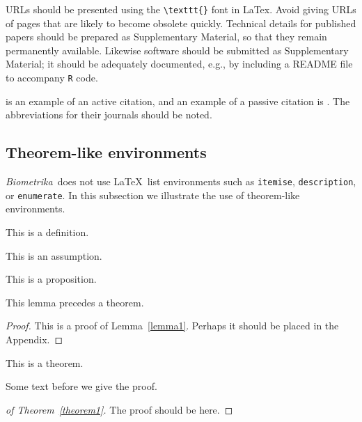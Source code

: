 \documentclass[lineno]{biometrika}
\def\Bka{{\it Biometrika}}
\begin{document}
 URLs should be presented using the \verb;\texttt{}; font in LaTex. Avoid giving URLs of pages that are likely
to become obsolete quickly.  Technical details for published papers should be prepared as Supplementary Material, so that they remain permanently available. Likewise software should be submitted as Supplementary Material; it should be adequately documented, e.g., by including a README file to accompany \texttt{R} code.

\citet{Cox:1972} is an example of an active citation, and an example of a passive citation is  \citep{Hear:Holm:Step:quan:2006}.  The abbreviations for their journals should be noted.

\subsection{Theorem-like environments}

\Bka\ does not use \LaTeX\ list environments such as \texttt{itemise}, \texttt{description}, or \texttt{enumerate}.
In this subsection we illustrate the use of theorem-like environments.

\begin{definition}
This is a definition.
\end{definition}

\begin{assumption}
\label{assumptionA}
This is an assumption.
\end{assumption}

\begin{proposition}
This is a proposition.
\end{proposition}

\begin{lemma}
\label{lemma1}
This lemma precedes a theorem.
\end{lemma}

\begin{proof}
This is a proof of Lemma~\ref{lemma1}.  Perhaps it should be placed in the Appendix.
\end{proof}

\begin{theorem}
\label{theorem1}
This is a theorem.
\end{theorem}

Some text before we give the proof.

\begin{proof}[of Theorem~\ref{theorem1}]
The proof should be here.
\end{proof}
\end{document}
